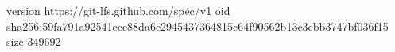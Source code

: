 version https://git-lfs.github.com/spec/v1
oid sha256:59fa791a92541ece88da6c2945437364815c64f90562b13c3cbb3747bf036f15
size 349692
